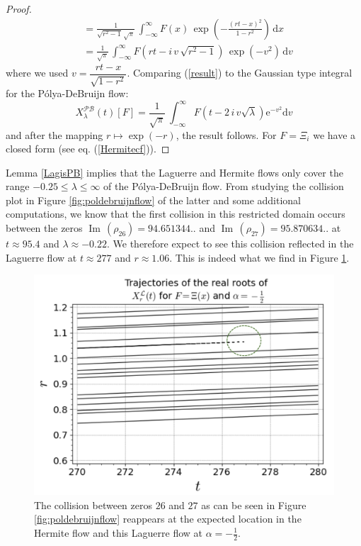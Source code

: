 \documentclass[a4paper,11pt,twoside]{amsart}
\renewcommand\Im{{\operatorname{Im\,}}}
\begin{document}
\begin{proof}
\begin{align}
&= \frac{1}{\sqrt{r^2-1}\,\sqrt{\pi}}\, \int_{-\infty}^\infty F(x)\,\exp\left(-\frac{(r t -x)^2}{1-r^2}\right)\,\mathrm{d} x \\
&= \frac{1}{\sqrt{\pi}}\, \int_{-\infty}^\infty F\left(r t- i\,v\, \sqrt{r^2-1}\right)\,\exp\left(-v^2\right)\,\mathrm{d} v \label{result}
\end{align}
where we used $v = \dfrac{r t -x}{\sqrt{1-r^2}}$. Comparing (\ref{result}) to the Gaussian type integral for the Pólya-DeBruijn flow:
\begin{equation}
X^{\mathcal{PB}}_{\lambda}(t)[F] =   \frac{1}{\sqrt{\pi}}\,\int_{-\infty}^\infty F\left(t - 2\,i\,v\sqrt{\lambda}\right)\mathrm{e}^{-v^2}\mathrm{d}v
\end{equation}
and after the mapping $r \mapsto \exp(-r)$, the result follows. For $F=\Xi_i$ we have a closed form (see eq. (\ref{Hermitecf})).
\end{proof}

Lemma \ref{LagisPB} implies that the Laguerre and Hermite flows only cover the range $-0.25 \le \lambda \le \infty$ of the Pólya-DeBruijn flow. From studying the collision plot in Figure \ref{fig:poldebruijnflow} of the latter and some additional computations, we know that the first collision in this restricted domain occurs between the zeros $\Im(\rho_{26}) = 94.651344..$ and $\Im(\rho_{27}) = 95.870634..$ at $t \approx 95.4$ and $\lambda \approx -0.22$. We therefore expect to see this collision reflected in the Laguerre flow at $t \approx 277$ and $r \approx 1.06$. This is indeed what we find in Figure \ref{fig:flowLcoll}.
\begin{figure}[H]
  \includegraphics[width=0.7\linewidth]{LaguerreFlowColl.jpg}
  \caption{The collision between zeros $26$ and $27$ as can be seen in Figure \ref{fig:poldebruijnflow} reappears at the expected location in the Hermite flow and this Laguerre flow at $\alpha = -\frac12$.}
  \label{fig:flowLcoll}
\end{figure}
\end{document}
